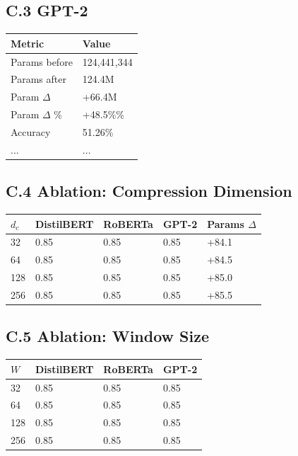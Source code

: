 \subsection{C.3 GPT-2}

\begin{table}[H]
\centering
\small
\begin{tabular}{ll}
\toprule
\textbf{Metric} & \textbf{Value} \\
\midrule
Params before & 124,441,344 \\
Params after & 124.4M \\
Param $\Delta$ & +66.4M \\
Param $\Delta$ \% & +48.5\%\% \\
Accuracy & 51.26\% \\
... & ... \\
\bottomrule
\end{tabular}
\end{table}

\subsection{C.4 Ablation: Compression Dimension}

\begin{table}[H]
\centering
\small
\begin{tabular}{lllll}
\toprule
\textbf{$d_c$} & \textbf{DistilBERT} & \textbf{RoBERTa} & \textbf{GPT-2} & \textbf{Params $\Delta$} \\
\midrule
32 & 0.85 & 0.85 & 0.85 & +84.1 \\
64 & 0.85 & 0.85 & 0.85 & +84.5 \\
128 & 0.85 & 0.85 & 0.85 & +85.0 \\
256 & 0.85 & 0.85 & 0.85 & +85.5 \\
\bottomrule
\end{tabular}
\end{table}

\subsection{C.5 Ablation: Window Size}

\begin{table}[H]
\centering
\small
\begin{tabular}{llll}
\toprule
\textbf{$W$} & \textbf{DistilBERT} & \textbf{RoBERTa} & \textbf{GPT-2} \\
\midrule
32 & 0.85 & 0.85 & 0.85 \\
64 & 0.85 & 0.85 & 0.85 \\
128 & 0.85 & 0.85 & 0.85 \\
256 & 0.85 & 0.85 & 0.85 \\
\bottomrule
\end{tabular}
\end{table}


